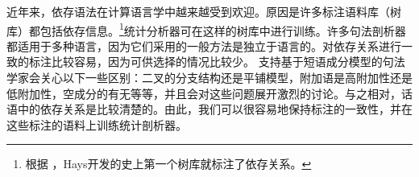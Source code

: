 %



近年来，依存语法在计算语言学中越来越受到欢迎。原因是许多标注语料库（树库）都包括依存信息。\footnote{%
根据 \citet{Kay2000a-u}，Hays开发的史上第一个树库就标注了依存关系。}统计分析器可在这样的树库中进行训练\citep{YM2003a-u,Attardi2006a-u,Nivre2003a-u,KMcDN2009a-u,Bohnet2010a-u}。许多句法剖析器都适用于多种语言，因为它们采用的一般方法是独立于语言的。对依存关系进行一致的标注比较容易，因为可供选择的情况比较少。
支持基于短语成分模型的句法学家会关心以下一些区别：二叉的分支结构还是平铺模型，附加语是高附加性还是低附加性，空成分的有无等等，并且会对这些问题展开激烈的讨论。与之相对，话语中的依存关系是比较清楚的。由此，我们可以很容易地保持标注的一致性，并在这些标注的语料上训练统计剖析器。

